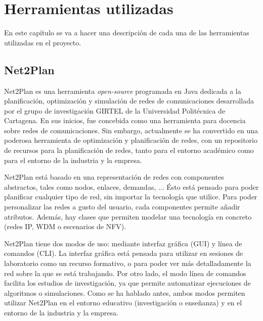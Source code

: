 \chapter{Herramientas utilizadas}

En este capítulo se va a hacer una descripción de cada una de las herramientas utilizadas en el proyecto.

\section{Net2Plan}
\label{sec:net2plan}

Net2Plan \cite{net2plan} es una herramienta \textit{open-source} programada en Java dedicada a la planificación, optimización y simulación de redes de comunicaciones desarrollada por el grupo de investigación GIRTEL de la Universidad Politécnica de Cartagena. En sus inicios, fue concebida como una herramienta para docencia sobre redes de comunicaciones. Sin embargo, actualmente se ha convertido en una poderosa herramienta de optimización y planificación de redes, con un repositorio de recursos para la planificación de redes, tanto para el entorno académico como para el entorno de la industria y la empresa.

Net2Plan está basado en una representación de redes con componentes abstractos, tales como nodos, enlaces, demandas, ... Ésto está pensado para poder planificar cualquier tipo de red, sin importar la tecnología que utilice. Para poder personalizar las redes a gusto del usuario, cada componentes permite añadir atributos. Además, hay clases que permiten modelar una tecnología en concreto (redes IP, WDM o escenarios de NFV).

Net2Plan tiene dos modos de uso: mediante interfaz gráfica (GUI) y línea de comandos (CLI). La interfaz gráfica está pensada para utilizar en sesiones de laboratorio como un recurso formativo, o para poder ver más detalladamente la red sobre la que se está trabajando. Por otro lado, el modo línea de comandos facilita los estudios de investigación, ya que permite automatizar ejecuciones de algoritmos o simulaciones.
Como se ha hablado antes, ambos modos permiten utilizar Net2Plan en el entorno educativo (investigación o enseñanza) y en el entorno de la industria y la empresa.

